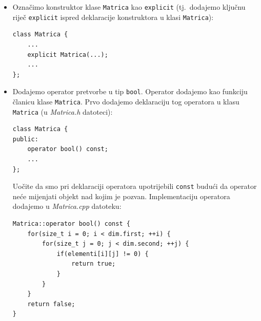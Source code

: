 \begin{rjesenje}
    \begin{itemize}
        \item[(a)] 
        Označimo konstruktor klase \texttt{Matrica} kao \texttt{explicit}
        (tj.\ dodajemo ključnu riječ \texttt{explicit}
        ispred deklaracije konstruktora u klasi \texttt{Matrica}):
        \begin{verbatim}
class Matrica {
    ...
    explicit Matrica(...);
    ...
};
        \end{verbatim}
        \item[(b)]
        Dodajemo operator pretvorbe u tip \texttt{bool}.
        Operator dodajemo kao funkciju članicu klase \texttt{Matrica}.
        Prvo dodajemo deklaraciju tog operatora u klasu \texttt{Matrica} (u \textit{Matrica.h} datoteci):
\begin{verbatim}
class Matrica {
public:
    operator bool() const;
    ...
};
        \end{verbatim}
        Uočite da smo pri deklaraciji operatora
        upotrijebili \texttt{const}
        budući da operator neće mijenjati objekt nad kojim je pozvan.
        Implementaciju operatora dodajemo u \textit{Matrica.cpp} datoteku:
        \begin{verbatim}
Matrica::operator bool() const {
    for(size_t i = 0; i < dim.first; ++i) {
        for(size_t j = 0; j < dim.second; ++j) {
            if(elementi[i][j] != 0) {
                return true;
            }
        }
    }
    return false;
}
        \end{verbatim}
    \end{itemize}
\end{rjesenje}


